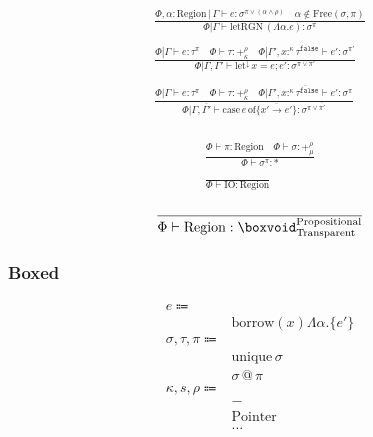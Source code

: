 \documentclass {article}
\begin{document}
\begin{gather*}
\frac
{\Phi , \alpha : \text{Region} \, | \, \Gamma \vdash e : \sigma^{\pi \lor (\alpha \land \rho)} \quad \alpha \notin \text{Free}(\sigma, \pi)}
{\Phi | \Gamma \vdash \text{letRGN} \, (\Lambda \alpha. e) : \sigma^\pi} \\
\\
\frac
{\Phi | \Gamma \vdash e : \tau^\pi \quad \Phi \vdash \tau : +^{\rho}_{\kappa} \quad \Phi | \Gamma', x :^{\kappa} \tau^\texttt{false} \vdash e' : \sigma^{\pi'}}
{\Phi | \Gamma, \Gamma' \vdash \text{let}^\downarrow \, x = e; e' : \sigma^{\pi \lor \pi'}} \\
\\
\frac
{\Phi | \Gamma \vdash e : \tau^\pi \quad \Phi \vdash \tau : +^{\rho}_{\kappa} \quad \overline{ \Phi | \Gamma', x :^{\kappa} \tau^\texttt{false} \vdash e' : \sigma^\pi }}
{\Phi | \Gamma, \overline {\Gamma'} \vdash \text{case} \, e \, \text{of} \{ \overline {x' \to  e' } \} : \sigma^{\pi \lor \overline{\pi'}}} \\
\end{gather*}

\begin{gather*}
\frac
{\Phi \vdash \pi : \text{Region} \quad \Phi \vdash \sigma : +^\rho_\mu}
{\Phi \vdash \sigma^\pi : *} \\
\\
\frac
{}
{\Phi \vdash \text{IO} : \text{Region}}
\end{gather*}

\begin{gather*}
\frac
{}
{\Phi \vdash \text{Region} : \boxvoid^{\text{Propositional}}_{\text{Transparent}}} \\
\end{gather*}

\subsubsection{Boxed}
\begin{align*}
e \Coloneqq & \\
& \text{borrow} (x)  \Lambda \alpha. \{ e' \} \\
\sigma, \tau, \pi \Coloneqq & \\
& \text{unique} \, \sigma \\
& \sigma \, @ \, \pi \\
\kappa, s, \rho \Coloneqq & \\
& - \tag{Boxed} \\
& \text{Pointer} \tag{Pointer Representation} \\
& \dots \\
\end{align*}
\end{document}
